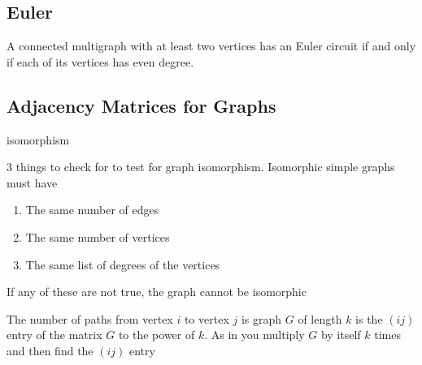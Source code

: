 \documentclass{article}
\begin{document}
\subsection{Euler}
\begin{theorem}
    A connected multigraph with at least two vertices has an Euler circuit if and only if each of its vertices has even degree.
\end{theorem}
\subsection{Adjacency Matrices for Graphs}
\begin{definition}
    isomorphism
\end{definition}
\begin{definition}
    3 things to check for to test for graph isomorphism. Isomorphic simple graphs must have
    \begin{enumerate}
        \item The same number of edges
        \item The same number of vertices
        \item The same list of degrees of the vertices
    \end{enumerate}
    If any of these are not true, the graph cannot be isomorphic
\end{definition}
\begin{theorem}
    The number of paths from vertex \(i\) to vertex \(j\) is graph \(G\) of length \(k\) is the \((ij)\) entry of the matrix \(G\) to the power of \(k\).
    As in you multiply \(G\) by itself \(k\) times and then find the \((ij)\) entry
\end{theorem}
\end{document}

